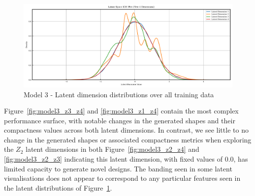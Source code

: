 \documentclass{article}
\begin{document}
\begin{figure}[H]
    \centering
    \includegraphics[width=0.75\linewidth]{figures/VAEmodels/model3/latent_distribution.png}
    \caption{Model 3 - Latent dimension distributions over all training data}
    \label{fig:model3_latent_dist}
\end{figure}
Figure~\ref{fig:model3_z3_z4} and \ref{fig:model3_z1_z4} contain the most complex performance surface, with notable changes in the generated shapes and their compactness values across both latent dimensions. In contrast, we see little to no change in the generated shapes or associated compactness metrics when exploring the $Z_2$ latent dimensions in both Figure~\ref{fig:model3_z2_z4} and \ref{fig:model3_z2_z3} indicating this latent dimension, with fixed values of 0.0, has limited capacity to generate novel designs. The banding seen in some latent visualisations does not appear to correspond to any particular features seen in the latent distributions of Figure~\ref{fig:model3_latent_dist}.
\end{document}
